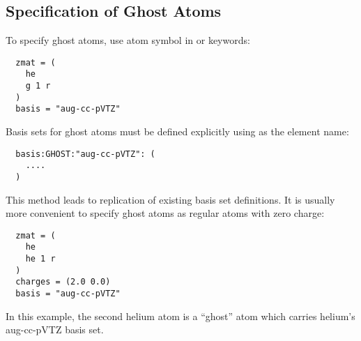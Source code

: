 \subsection{Specification of Ghost Atoms}

To specify ghost atoms, use atom symbol  in
 or  keywords:
\begin{verbatim}
  zmat = (
    he
    g 1 r
  )
  basis = "aug-cc-pVTZ"
\end{verbatim}
Basis sets for ghost atoms
must be defined explicitly using  as the element name:
\begin{verbatim}
  basis:GHOST:"aug-cc-pVTZ": (
    ....
  )
\end{verbatim}
This method leads to replication of existing basis set
definitions.
It is usually more convenient to specify ghost atoms as regular atoms
with zero charge:
\begin{verbatim}
  zmat = (
    he
    he 1 r
  )
  charges = (2.0 0.0)
  basis = "aug-cc-pVTZ"
\end{verbatim}
In this example, the second helium atom is a ``ghost'' atom which carries
helium's aug-cc-pVTZ basis set.

